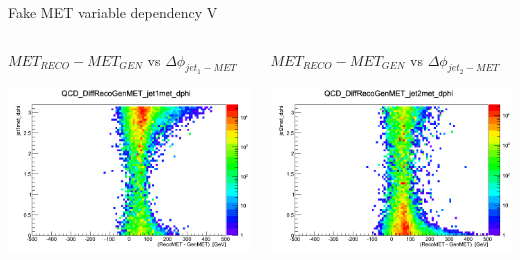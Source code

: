 \documentclass[8pt]{beamer}
\begin{document}
\begin{frame}{Fake MET variable dependency V}
 
\begin{columns}

\begin{block}{$MET_{RECO}-MET_{GEN}$ vs $\Delta\phi_{jet_1-MET}$}
 
\centering
\includegraphics[width=\linewidth]{img/QCD_DiffRecoGenMET_jet1met_dphi.png} 
 
\end{block}

\begin{block}{$MET_{RECO}-MET_{GEN}$ vs $\Delta\phi_{jet_2-MET}$}

\centering
\includegraphics[width=\linewidth]{img/QCD_DiffRecoGenMET_jet2met_dphi.png} 
 

\end{block}
\end{columns}
\end{frame}
\end{document}
